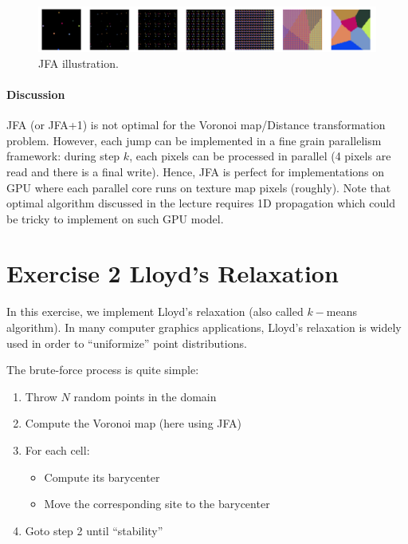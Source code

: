 \documentclass[a4paper, 11pt]{article}
\begin{document}
\begin{figure}[h]
  \centering  \includegraphics[width=15cm]{jfa}
  \caption{JFA illustration.}
\end{figure}


\paragraph{Discussion}
\par JFA (or JFA+1) is not optimal for the Voronoi map/Distance transformation problem. However, each jump can be implemented in a fine grain parallelism framework: during step $k$, each pixels can be processed in parallel (4 pixels are read and there is a final write). Hence, JFA is perfect for implementations on GPU where each
parallel core runs on texture map pixels (roughly). Note that optimal algorithm discussed in the lecture requires 1D propagation which could be tricky to implement on such GPU model.


\section*{Exercise 2 \rm Lloyd's Relaxation}

\par In this exercise, we implement Lloyd's relaxation (also called $k-$means algorithm).  In many computer graphics applications, Lloyd's relaxation is widely used in order to ``uniformize'' point distributions.

The brute-force process is quite simple:
\begin{enumerate}
	\item Throw $N$ random points in the domain
	\item Compute the Voronoi map (here using JFA)
	\item For each cell:
	\begin{itemize}
		\item Compute its barycenter
		\item Move the corresponding site to the barycenter
	\end{itemize}
	\item Goto step 2 until ``stability''
\end{enumerate}
\end{document}
